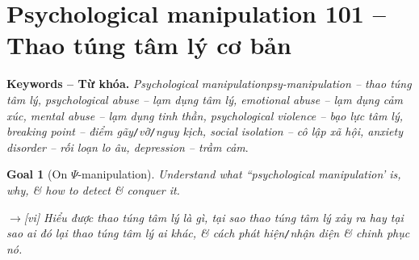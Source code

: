 \documentclass[12pt,twoside]{book}
\newtheorem{goal}{Goal}
\begin{document}
\section{Psychological manipulation 101 -- Thao túng tâm lý cơ bản}
\label{sect: psychological manipulation}
{\bf Keywords -- Từ khóa.} {\it Psychological manipulation\Gls{psy-manipulation} -- thao túng tâm lý, psychological abuse -- lạm dụng tâm lý, emotional abuse -- lạm dụng cảm xúc, mental abuse -- lạm dụng tinh thần,  psychological violence -- bạo lực tâm lý, breaking point -- điểm gãy{\tt/}vỡ{\tt/}nguy kịch, social isolation -- cô lập xã hội, anxiety disorder -- rối loạn lo âu, depression -- trầm cảm}.

\begin{goal}[On $\Psi$-manipulation]
	Understand what ``psychological manipulation' is, why, \& how to detect \& conquer it.
	
	{\sf[en]$\to$[vi]} Hiểu được thao túng tâm lý là gì, tại sao thao túng tâm lý xảy ra hay tại sao ai đó lại thao túng tâm lý ai khác, \& cách phát hiện{\tt/}nhận diện \& chinh phục nó.
\end{goal}
\end{document}
